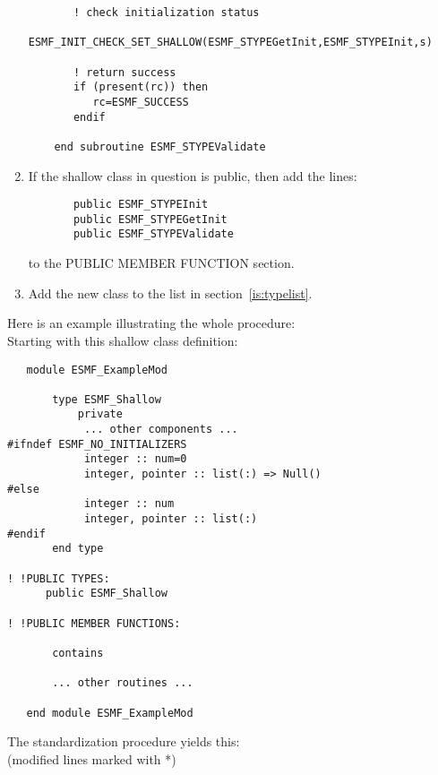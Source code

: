 \begin{enumerate}
\begin{verbatim}
       ! check initialization status
       ESMF_INIT_CHECK_SET_SHALLOW(ESMF_STYPEGetInit,ESMF_STYPEInit,s)
       
       ! return success
       if (present(rc)) then
          rc=ESMF_SUCCESS
       endif

    end subroutine ESMF_STYPEValidate
\end{verbatim}

\item If the shallow class in question is public, then
    add the lines:
\begin{verbatim}
       public ESMF_STYPEInit
       public ESMF_STYPEGetInit
       public ESMF_STYPEValidate
\end{verbatim}
    to the PUBLIC MEMBER FUNCTION section. 

\item Add the new class to the list in section~\ref{is:typelist}.

\end{enumerate}

Here is an example illustrating the whole procedure: \\

Starting with this shallow class definition:

\begin{verbatim}
   module ESMF_ExampleMod

       type ESMF_Shallow
           private
            ... other components ...
#ifndef ESMF_NO_INITIALIZERS
            integer :: num=0
            integer, pointer :: list(:) => Null()
#else
            integer :: num
            integer, pointer :: list(:)
#endif
       end type

! !PUBLIC TYPES:
      public ESMF_Shallow 
     
! !PUBLIC MEMBER FUNCTIONS:

       contains

       ... other routines ...

   end module ESMF_ExampleMod
\end{verbatim}

The standardization procedure yields this:\\
(modified lines marked with *)

